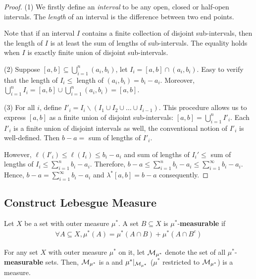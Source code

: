 \documentclass[11pt]{article}
\begin{document}
\begin{proposition}
\begin{proof}
			(1) We firstly define an \emph{interval} to be any open, closed or half-open intervals. The \emph{length} of an interval is the difference between two end points.
			
			Note that if an interval $I$ contains a finite collection of disjoint sub-intervals, then the length of $I$ is at least the sum of lengths of sub-intervals. The equality holds when $I$ is exactly finite union of disjoint sub-intervals.
			
			(2) Suppose $[a, b] \subseteq \bigcup_{i=1}^n (a_i, b_i)$, let $I_i = [a, b] \cap (a_i, b_i)$.
			Easy to verify that the length of $I_i \leq$ length of $(a_i, b_i) = b_i - a_i$.
			Moreover, $\bigcup_{i=1}^n I_i = [a, b] \cup \bigcup_{i=1}^n (a_i, b_i) = [a, b]$.
			
			(3) For all $i$, define $I'_i = I_i \backslash (I_1 \cup I_2 \cup \dots \cup I_{i-1})$. This procedure allows us to express $[a, b]$ as a finite union of disjoint sub-intervals: $[a, b] = \bigcup_{i=1}^n I'_i$. Each $I'_i$ is a finite union of disjoint intervals as well, the conventional notion of $I'_i$ is well-defined.
			Then $b - a = $ sum of lengths of $I'_i$.
			
			However, $\ell(I'_i) \leq \ell(I_i) \leq b_i - a_i$ and sum of lengths of $I_i' \leq$ sum of lengths of $I_i \leq \sum_{i=1}^n b_i - a_i$.
			Therefore, $b - a \leq \sum_{i=1}^n b_i - a_i \leq \sum_{i=1}^\infty b_i - a_i$.
			Hence, $b - a = \sum_{i=1}^\infty b_i - a_i$ and $\lambda^*[a, b] = b - a$ consequently.
		\end{proof}
	\end{proposition}
	
	\subsection{Construct Lebesgue Measure}
	
	\begin{definition}
		Let $X$ be a set with outer measure $\mu^*$. A set $B \subseteq X$ is $\mu^*$-\textbf{measurable} if
		\begin{align}
			\forall A \subseteq X, \mu^*(A) = \mu^*(A \cap B) + \mu^*(A \cap B^c)
		\end{align}
	\end{definition}
	
	\begin{theorem}
		For any set $X$ with outer measure $\mu^*$ on it, let $\mathcal{{M}}_{\mu^*}$ denote the set of all $\mu^*$-\textbf{measurable} sets. Then, $\mathcal{{M}}_{\mu^*}$ is a \salg and $\mu^*|_{\mathcal{{M}}_{\mu^*}}$ ($\mu^*$ restricted to $\mathcal{{M}}_{\mu^*}$) is a measure.
	\end{theorem}
	
\end{document}
